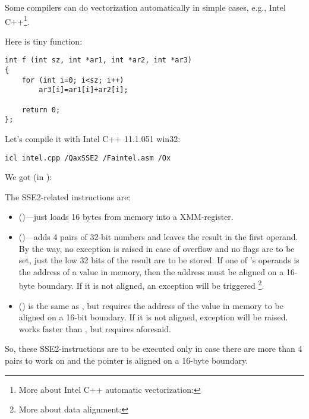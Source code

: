 
Some compilers can do vectorization automatically in simple cases, 
e.g., Intel C++\footnote{More about Intel C++ automatic vectorization: \URLINTELVEC}.

Here is tiny function:

\begin{lstlisting}[style=customc]
int f (int sz, int *ar1, int *ar2, int *ar3)
{
	for (int i=0; i<sz; i++)
		ar3[i]=ar1[i]+ar2[i];

	return 0;
};
\end{lstlisting}


Let's compile it with Intel C++ 11.1.051 win32:

\begin{verbatim}
icl intel.cpp /QaxSSE2 /Faintel.asm /Ox
\end{verbatim}

We got (in \IDA):



The SSE2-related instructions are:
\begin{itemize}
\item
\MOVDQU ()---just loads 16 bytes from memory into a XMM-register.

\item
\PADDD ()---adds 4 pairs of 32-bit numbers and leaves the result in the first operand.
By the way, no exception is raised in case of overflow and no flags are to be set, 
just the low 32 bits of the result are to be stored.
If one of \PADDD's operands is the address of a value in memory,
then the address must be aligned on a 16-byte boundary. 
If it is not aligned, an exception will be triggered
\footnote{More about data alignment: \URLWPDA}.

\item
\MOVDQA ()
is the same as \MOVDQU, but requires the address of the value in memory to be aligned on a 16-bit boundary.
If it is not aligned, exception will be raised.
\MOVDQA works faster than \MOVDQU, but requires aforesaid.

\end{itemize}

So, these SSE2-instructions are to be executed only in case there are more than 4 pairs to work on
and the pointer  is aligned on a 16-byte boundary.

